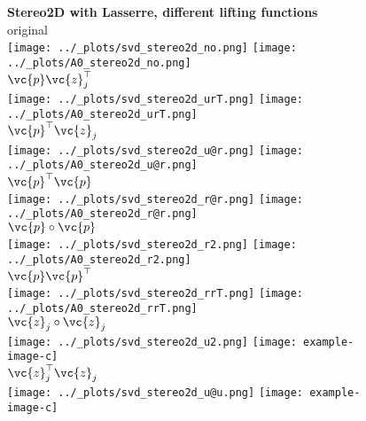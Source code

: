 \begin{figure}[h]
  \centering
  \textbf{\large{Stereo2D with Lasserre, different lifting functions}}\\
  original \\
  \texttt{[image: ../\_plots/svd\_stereo2d\_no.png]}
  \texttt{[image: ../\_plots/A0\_stereo2d\_no.png]} \\
  $\vc{p}\vc{z}_j^\top$ \\
  \texttt{[image: ../\_plots/svd\_stereo2d\_urT.png]}
  \texttt{[image: ../\_plots/A0\_stereo2d\_urT.png]} \\
  $\vc{p}^\top\vc{z}_j$ \\
  \texttt{[image: ../\_plots/svd\_stereo2d\_u@r.png]}
  \texttt{[image: ../\_plots/A0\_stereo2d\_u@r.png]} \\
  $\vc{p}^\top\vc{p}$ \\
  \texttt{[image: ../\_plots/svd\_stereo2d\_r@r.png]}
  \texttt{[image: ../\_plots/A0\_stereo2d\_r@r.png]} \\
  $\vc{p}\circ\vc{p}$ \\
  \texttt{[image: ../\_plots/svd\_stereo2d\_r2.png]}
  \texttt{[image: ../\_plots/A0\_stereo2d\_r2.png]}  \\
  $\vc{p}\vc{p}^\top$ \\
  \texttt{[image: ../\_plots/svd\_stereo2d\_rrT.png]}
  \texttt{[image: ../\_plots/A0\_stereo2d\_rrT.png]}  \\
  $\vc{z}_j\circ\vc{z}_j$ \\
  \texttt{[image: ../\_plots/svd\_stereo2d\_u2.png]} 
  \texttt{[image: example-image-c]}  \\
  $\vc{z}_j^\top\vc{z}_j$ \\
  \texttt{[image: ../\_plots/svd\_stereo2d\_u@u.png]}
  \texttt{[image: example-image-c]}  \\
\end{figure}

